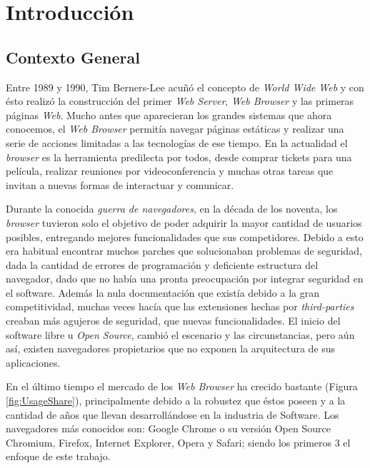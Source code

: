 


\chapter{Introducción}
\label{chap1:intro}


\section{Contexto General}
\label{chap1:CG}

Entre 1989 y 1990, Tim Berners-Lee acuñó el concepto de \textit{World Wide Web} y con ésto realizó la construcción del primer \textit{Web Server}, \textit{Web Browser} y las primeras páginas \textit{Web}. Mucho antes que aparecieran los grandes sistemas que ahora conocemos, el \textit{Web Browser} permitía navegar páginas estáticas y realizar una serie de acciones limitadas a las tecnologías de ese tiempo. En la actualidad el \textit{browser} es la herramienta predilecta por todos, desde comprar tickets para una película, realizar reuniones por videoconferencia y muchas otras tareas que invitan a nuevas formas de interactuar y comunicar.

Durante la conocida \textit{guerra de navegadores}, en la década de los noventa, los \textit{browser} tuvieron solo el objetivo de poder adquirir la mayor cantidad de usuarios posibles, entregando mejores funcionalidades que sus competidores. Debido a esto era habitual encontrar muchos parches que solucionaban problemas de seguridad, dada la cantidad de errores de programación y deficiente estructura del navegador, dado que no había una pronta preocupación por integrar seguridad en el software. Además la nula documentación que existía debido a la gran competitividad, muchas veces hacía que las extensiones hechas por \textit{third-parties} creaban más agujeros de seguridad, que nuevas funcionalidades. El inicio del software libre u \textit{Open Source}, cambió el escenario y las circunstancias, pero aún así, existen navegadores propietarios que no exponen la arquitectura de sus aplicaciones.

En el último tiempo el mercado de los \textit{Web Browser} ha crecido bastante (Figura \ref{fig:UsageShare}), principalmente debido a la robustez que éstos poseen y a la cantidad de años que llevan desarrollándose en la industria de Software. Los navegadores más conocidos son: Google Chrome o su versión Open Source Chromium, Firefox, Internet Explorer, Opera y Safari; siendo los primeros 3 el enfoque de este trabajo.

